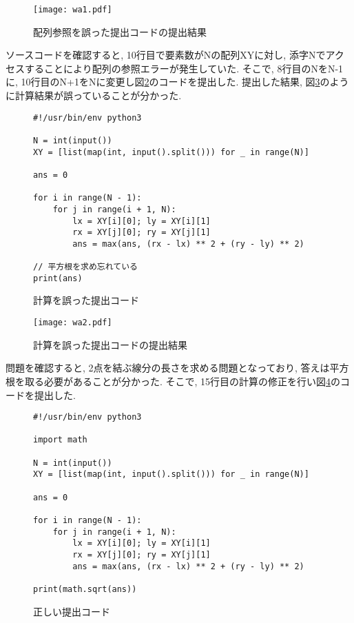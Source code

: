 \begin{figure}[H]
    \centering
    \texttt{[image: wa1.pdf]}
    \caption{配列参照を誤った提出コードの提出結果}
    \label{code:wa1-sub}
\end{figure}

\clearpage

ソースコードを確認すると, 10行目で要素数がNの配列XYに対し, 添字Nでアクセスすることにより配列の参照エラーが発生していた. 
そこで, 8行目のNをN-1に, 10行目のN+1をNに変更し図\ref{code:wa2}のコードを提出した. 
提出した結果, 図\ref{code:wa2-sub}のように計算結果が誤っていることが分かった. 

\begin{figure}[H]
    \centering
\begin{lstlisting}[style = customPy]
#!/usr/bin/env python3

N = int(input())
XY = [list(map(int, input().split())) for _ in range(N)]

ans = 0

for i in range(N - 1):
    for j in range(i + 1, N):
        lx = XY[i][0]; ly = XY[i][1]
        rx = XY[j][0]; ry = XY[j][1]
        ans = max(ans, (rx - lx) ** 2 + (ry - ly) ** 2)

// 平方根を求め忘れている
print(ans)
\end{lstlisting}
\caption{計算を誤った提出コード}
    \label{code:wa2}
\end{figure}

\begin{figure}[H]
    \centering
    \texttt{[image: wa2.pdf]}
    \caption{計算を誤った提出コードの提出結果}
    \label{code:wa2-sub}
\end{figure}

\clearpage
問題を確認すると, 2点を結ぶ線分の長さを求める問題となっており, 答えは平方根を取る必要があることが分かった. 
そこで, 15行目の計算の修正を行い図\ref{code:ac}のコードを提出した. 

\begin{figure}[H]
    \centering
\begin{lstlisting}[style = customPy]
#!/usr/bin/env python3

import math

N = int(input())
XY = [list(map(int, input().split())) for _ in range(N)]

ans = 0

for i in range(N - 1):
    for j in range(i + 1, N):
        lx = XY[i][0]; ly = XY[i][1]
        rx = XY[j][0]; ry = XY[j][1]
        ans = max(ans, (rx - lx) ** 2 + (ry - ly) ** 2)

print(math.sqrt(ans))

\end{lstlisting}
\caption{正しい提出コード}
    \label{code:ac}
\end{figure}

